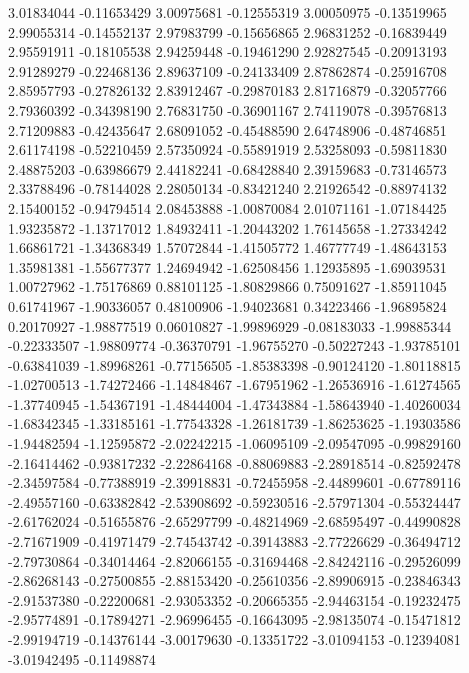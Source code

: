 3.01834044   -0.11653429 
3.00975681   -0.12555319 
3.00050975   -0.13519965 
2.99055314   -0.14552137 
2.97983799   -0.15656865 
2.96831252   -0.16839449 
2.95591911   -0.18105538 
2.94259448   -0.19461290 
2.92827545   -0.20913193 
2.91289279   -0.22468136 
2.89637109   -0.24133409 
2.87862874   -0.25916708 
2.85957793   -0.27826132 
2.83912467   -0.29870183 
2.81716879   -0.32057766 
2.79360392   -0.34398190 
2.76831750   -0.36901167 
2.74119078   -0.39576813 
2.71209883   -0.42435647 
2.68091052   -0.45488590 
2.64748906   -0.48746851 
2.61174198   -0.52210459 
2.57350924   -0.55891919 
2.53258093   -0.59811830 
2.48875203   -0.63986679 
2.44182241   -0.68428840 
2.39159683   -0.73146573 
2.33788496   -0.78144028 
2.28050134   -0.83421240 
2.21926542   -0.88974132 
2.15400152   -0.94794514 
2.08453888   -1.00870084 
2.01071161   -1.07184425 
1.93235872   -1.13717012 
1.84932411   -1.20443202 
1.76145658   -1.27334242 
1.66861721   -1.34368349 
1.57072844   -1.41505772 
1.46777749   -1.48643153 
1.35981381   -1.55677377 
1.24694942   -1.62508456 
1.12935895   -1.69039531 
1.00727962   -1.75176869 
0.88101125   -1.80829866 
0.75091627   -1.85911045 
0.61741967   -1.90336057 
0.48100906   -1.94023681 
0.34223466   -1.96895824 
0.20170927   -1.98877519 
0.06010827   -1.99896929 
-0.08183033  -1.99885344 
-0.22333507  -1.98809774 
-0.36370791  -1.96755270 
-0.50227243  -1.93785101 
-0.63841039  -1.89968261 
-0.77156505  -1.85383398 
-0.90124120  -1.80118815 
-1.02700513  -1.74272466 
-1.14848467  -1.67951962 
-1.26536916  -1.61274565 
-1.37740945  -1.54367191 
-1.48444004  -1.47343884 
-1.58643940  -1.40260034 
-1.68342345  -1.33185161 
-1.77543328  -1.26181739 
-1.86253625  -1.19303586 
-1.94482594  -1.12595872 
-2.02242215  -1.06095109 
-2.09547095  -0.99829160 
-2.16414462  -0.93817232 
-2.22864168  -0.88069883 
-2.28918514  -0.82592478 
-2.34597584  -0.77388919 
-2.39918831  -0.72455958 
-2.44899601  -0.67789116 
-2.49557160  -0.63382842 
-2.53908692  -0.59230516 
-2.57971304  -0.55324447 
-2.61762024  -0.51655876 
-2.65297799  -0.48214969 
-2.68595497  -0.44990828 
-2.71671909  -0.41971479 
-2.74543742  -0.39143883 
-2.77226629  -0.36494712 
-2.79730864  -0.34014464 
-2.82066155  -0.31694468 
-2.84242116  -0.29526099 
-2.86268143  -0.27500855 
-2.88153420  -0.25610356 
-2.89906915  -0.23846343 
-2.91537380  -0.22200681 
-2.93053352  -0.20665355 
-2.94463154  -0.19232475 
-2.95774891  -0.17894271 
-2.96996455  -0.16643095 
-2.98135074  -0.15471812 
-2.99194719  -0.14376144 
-3.00179630  -0.13351722 
-3.01094153  -0.12394081 
-3.01942495  -0.11498874 

